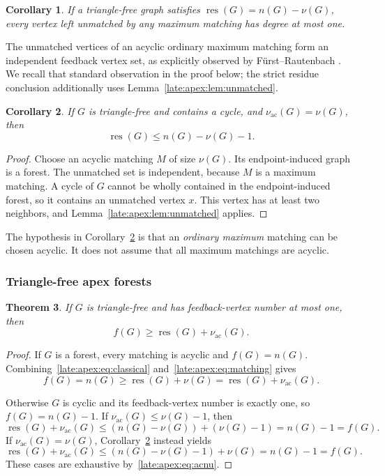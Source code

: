 \documentclass[11pt,a4paper]{article}
\newtheorem{theorem}{Theorem}[section]
\newtheorem{corollary}[theorem]{Corollary}
\theoremstyle{definition}\newtheorem{definition}[theorem]{Definition}
\theoremstyle{remark}\newtheorem{remark}[theorem]{Remark}
\newcommand{\res}{\operatorname{res}}
\begin{document}
\begin{corollary}\label{late:apex:cor:tight-unmatched}
If a triangle-free graph satisfies $\res(G)=n(G)-\nu(G)$, every vertex
left unmatched by any maximum matching has degree at most one.
\end{corollary}

The unmatched vertices of an acyclic ordinary maximum matching form an
independent feedback vertex set, as explicitly observed by
F\"urst--Rautenbach \cite[Conclusion]{late:apex:FR}. We recall that standard
observation in the proof below; the strict residue conclusion additionally
uses Lemma~\ref{late:apex:lem:unmatched}.

\begin{corollary}\label{late:apex:cor:cyclic}
If $G$ is triangle-free and contains a cycle, and
$\nu_{\mathrm{ac}}(G)=\nu(G)$, then
\[
 \res(G)\le n(G)-\nu(G)-1.
\]
\end{corollary}
\begin{proof}
Choose an acyclic matching $M$ of size $\nu(G)$. Its endpoint-induced
graph is a forest. The unmatched set is independent, because $M$ is a
maximum matching. A cycle of $G$ cannot be wholly contained in the
endpoint-induced forest, so it contains an unmatched vertex $x$.
This vertex has at least two neighbors, and Lemma~\ref{late:apex:lem:unmatched}
applies.
\end{proof}

The hypothesis in Corollary~\ref{late:apex:cor:cyclic} is that an \emph{ordinary
maximum} matching can be chosen acyclic. It does not assume that all
maximum matchings are acyclic.

\subsubsection{Triangle-free apex forests}
\begin{theorem}\label{late:apex:thm:apex}
If $G$ is triangle-free and has feedback-vertex number at most one, then
\begin{equation}\label{late:apex:eq:main}
 f(G)\ge\res(G)+\nu_{\mathrm{ac}}(G).
\end{equation}
\end{theorem}
\begin{proof}
If $G$ is a forest, every matching is acyclic and $f(G)=n(G)$.
Combining~\eqref{late:apex:eq:classical} and~\eqref{late:apex:eq:matching} gives
\[
 f(G)=n(G)\ge\res(G)+\nu(G)=\res(G)+\nu_{\mathrm{ac}}(G).
\]

Otherwise $G$ is cyclic and its feedback-vertex number is exactly one,
so $f(G)=n(G)-1$. If $\nu_{\mathrm{ac}}(G)\le\nu(G)-1$, then
\[
 \res(G)+\nu_{\mathrm{ac}}(G)
 \le(n(G)-\nu(G))+(\nu(G)-1)
 =n(G)-1=f(G).
\]
If $\nu_{\mathrm{ac}}(G)=\nu(G)$, Corollary~\ref{late:apex:cor:cyclic} instead yields
\[
 \res(G)+\nu_{\mathrm{ac}}(G)
 \le(n(G)-\nu(G)-1)+\nu(G)
 =n(G)-1=f(G).
\]
These cases are exhaustive by~\eqref{late:apex:eq:acnu}.
\end{proof}
\end{document}
